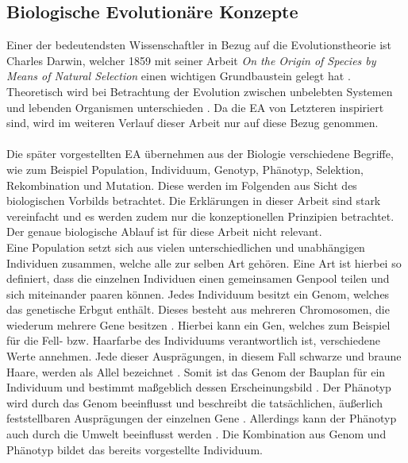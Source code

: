\subsection{Biologische Evolutionäre Konzepte}
\label{subsec:biological_evolution}
Einer der bedeutendsten Wissenschaftler in Bezug auf die Evolutionstheorie ist Charles Darwin, welcher 1859 mit seiner Arbeit \emph{On the Origin of Species by Means of Natural Selection} einen wichtigen Grundbaustein gelegt hat \cite{russell2013kunstliche}. Theoretisch wird bei Betrachtung der Evolution zwischen unbelebten Systemen und lebenden Organismen unterschieden \cite{weicker2015evolutionare}. Da die \ac{EA} von Letzteren inspiriert sind, wird im weiteren Verlauf dieser Arbeit nur auf diese Bezug genommen.
\\\\
Die später vorgestellten \ac{EA} übernehmen aus der Biologie verschiedene Begriffe, wie zum Beispiel Population, Individuum, Genotyp, Phänotyp, Selektion, Rekombination und Mutation. Diese werden im Folgenden aus Sicht des biologischen Vorbilds betrachtet. Die Erklärungen in dieser Arbeit sind stark vereinfacht und es werden zudem nur die konzeptionellen Prinzipien betrachtet. Der genaue biologische Ablauf ist für diese Arbeit nicht relevant.\\
Eine Population setzt sich aus vielen unterschiedlichen und unabhängigen Individuen zusammen, welche alle zur selben Art gehören. Eine Art ist hierbei so definiert, dass die einzelnen Individuen einen gemeinsamen Genpool teilen und sich miteinander paaren können. Jedes Individuum besitzt ein Genom, welches das genetische Erbgut enthält. Dieses besteht aus mehreren Chromosomen, die wiederum mehrere Gene besitzen \cite{weicker2015evolutionare}. Hierbei kann ein Gen, welches zum Beispiel für die Fell- bzw. Haarfarbe des Individuums verantwortlich ist, verschiedene Werte annehmen. Jede dieser Ausprägungen, in diesem Fall schwarze und braune Haare, werden als Allel bezeichnet \cite{weicker2015evolutionare}. Somit ist das Genom der Bauplan für ein Individuum und bestimmt maßgeblich dessen Erscheinungsbild \cite{kirschbaum2008biopsychologie}. Der Phänotyp wird durch das Genom beeinflusst und beschreibt die tatsächlichen, äußerlich feststellbaren Ausprägungen der einzelnen Gene \cite{weicker2015evolutionare}. Allerdings kann der Phänotyp auch durch die Umwelt beeinflusst werden \cite{kirschbaum2008biopsychologie}. Die Kombination aus Genom und Phänotyp bildet das bereits vorgestellte Individuum. 
\\\\
